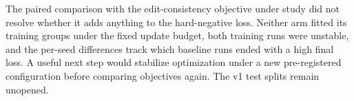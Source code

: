 The paired comparison with the edit-consistency objective under study did not resolve whether it
adds anything to the hard-negative loss. Neither arm fitted its training groups under the fixed
update budget, both training runs were unstable, and the per-seed differences track which baseline
runs ended with a high final loss. A useful next step would stabilize optimization under a new
pre-registered configuration before comparing objectives again. The v1 test splits remain unopened.
